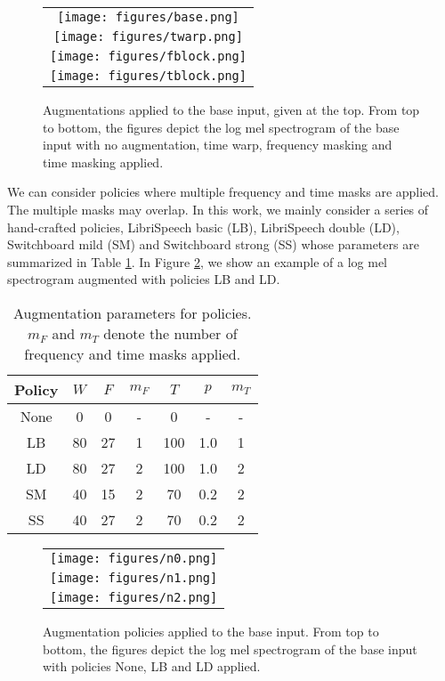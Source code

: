 \begin{figure}[t]
  \centering
  \begin{tabular}{c}
  \texttt{[image: figures/base.png]} \\
  \texttt{[image: figures/twarp.png]} \\
  \texttt{[image: figures/fblock.png]} \\
  \texttt{[image: figures/tblock.png]}
  \end{tabular}
  \vskip -0.1in
  \caption{Augmentations applied to the base input, given at the top. From top to bottom, the figures depict the log mel spectrogram of the base input with no augmentation, time warp, frequency masking and time masking applied.}
  \label{fig:augs}
\end{figure}

We can consider policies where multiple frequency and time masks are applied. The multiple masks may overlap. In this work, we mainly consider a series of hand-crafted policies, LibriSpeech basic (LB), LibriSpeech double (LD), Switchboard mild (SM) and Switchboard strong (SS) whose parameters are summarized in Table \ref{t:policies}. In Figure \ref{fig:policies}, we show an example of a log mel spectrogram augmented with policies LB and LD.

\begin{table}[h]
  \caption{Augmentation parameters for policies. $m_F$ and $m_T$ denote the number of frequency and time masks applied.}
  \label{t:policies}
  \centering
  \footnotesize
  \begin{tabular}{ccccccc}
    \toprule
    Policy & $W$ & $F$ & $m_F$ & $T$ & $p$ & $m_T$ \\
    \midrule
    None & 0 & 0 & - & 0 & - & - \\
    LB & 80 & 27 & 1 & 100 & 1.0 & 1\\
    LD & 80 & 27 & 2 & 100 & 1.0 & 2 \\
    SM & 40 & 15 & 2 & 70 & 0.2 & 2\\
    SS & 40 & 27 & 2 & 70 & 0.2 & 2\\
    \bottomrule
  \end{tabular}
  \vskip -0.1in
\end{table}

\begin{figure}[t]
  \centering
  \begin{tabular}{c}
  \texttt{[image: figures/n0.png]} \\
  \texttt{[image: figures/n1.png]} \\
  \texttt{[image: figures/n2.png]}
  \end{tabular}
  \vskip -0.05in
  \caption{Augmentation policies applied to the base input. From top to bottom, the figures depict the log mel spectrogram of the base input with policies None, LB and LD applied.}
  \label{fig:policies}
  \vskip -0.15in
\end{figure}

